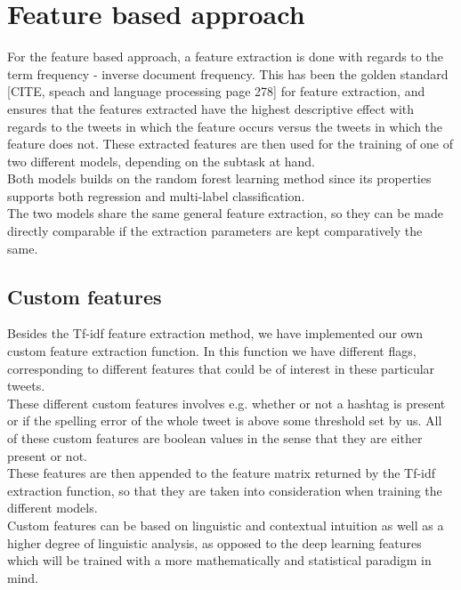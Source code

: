 
\section{Feature based approach}

For the feature based approach, a feature extraction is done with regards to the term frequency - inverse document frequency. This has been the golden standard [CITE, speach and language processing page 278] for feature extraction, and ensures that the features extracted have the highest descriptive effect with regards to the tweets in which the feature occurs versus the tweets in which the feature does not. These extracted features are then used for the training of one of two different models, depending on the subtask at hand.\\
Both models builds on the random forest learning method since its properties supports both regression and multi-label classification. \\
The two models share the same general feature extraction, so they can be made directly comparable if the extraction parameters are kept comparatively the same.

\subsection{Custom features}
Besides the Tf-idf feature extraction method, we have implemented our own custom feature extraction function. In this function we have different flags, corresponding to different features that could be of interest in these particular tweets. \\
These different custom features involves e.g. whether or not a hashtag is present or if the spelling error of the whole tweet is above some threshold set by us. All of these custom features are boolean values in the sense that they are either present or not. \\
These features are then appended to the feature matrix returned by the Tf-idf extraction function, so that they are taken into consideration when training the different models. \\
Custom features can be based on linguistic and contextual intuition as well as a higher degree of linguistic analysis, as opposed to the deep learning features which will be trained with a more mathematically and statistical paradigm in mind.

